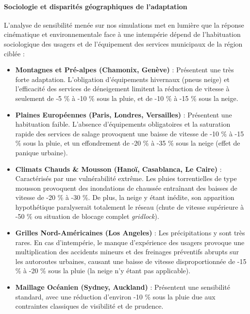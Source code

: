 \documentclass[10pt, a4paper]{article}
\providecommand{\tightlist}{}
\begin{document}
\paragraph{Sociologie et disparités géographiques de
l'adaptation}\label{sociologie-et-disparituxe9s-guxe9ographiques-de-ladaptation}

L'analyse de sensibilité menée sur nos simulations met en lumière que la
réponse cinématique et environnementale face à une intempérie dépend de
l'habituation sociologique des usagers et de l'équipement des services
municipaux de la région ciblée :

\begin{itemize}
\tightlist
\item
  \textbf{Montagnes et Pré-alpes (Chamonix, Genève)} : Présentent une
  très forte adaptation. L'obligation d'équipements hivernaux (pneus
  neige) et l'efficacité des services de déneigement limitent la
  réduction de vitesse à seulement de -5 \% à -10 \% sous la pluie, et
  de -10 \% à -15 \% sous la neige.
\item
  \textbf{Plaines Européennes (Paris, Londres, Versailles)} : Présentent
  une habituation faible. L'absence d'équipements obligatoires et la
  saturation rapide des services de salage provoquent une baisse de
  vitesse de -10 \% à -15 \% sous la pluie, et un effondrement de -20 \%
  à -35 \% sous la neige (effet de panique urbaine).
\item
  \textbf{Climats Chauds \& Mousson (Hanoï, Casablanca, Le Caire)} :
  Caractérisés par une vulnérabilité extrême. Les pluies torrentielles
  de type mousson provoquent des inondations de chaussée entraînant des
  baisses de vitesse de -20 \% à -30 \%. De plus, la neige y étant
  inédite, son apparition hypothétique paralyserait totalement le réseau
  (chute de vitesse supérieure à -50 \% ou situation de blocage complet
  \emph{gridlock}).
\item
  \textbf{Grilles Nord-Américaines (Los Angeles)} : Les précipitations y
  sont très rares. En cas d'intempérie, le manque d'expérience des
  usagers provoque une multiplication des accidents mineurs et des
  freinages préventifs abrupts sur les autoroutes urbaines, causant une
  baisse de vitesse disproportionnée de -15 \% à -20 \% sous la pluie
  (la neige n'y étant pas applicable).
\item
  \textbf{Maillage Océanien (Sydney, Auckland)} : Présentent une
  sensibilité standard, avec une réduction d'environ -10 \% sous la
  pluie due aux contraintes classiques de visibilité et de prudence.
\end{itemize}
\end{document}
